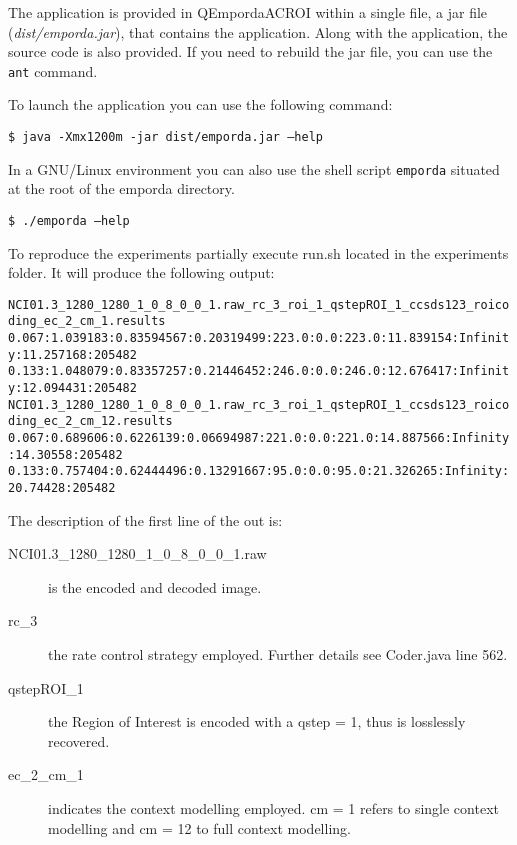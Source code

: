 \documentclass[a4paper,10pt]{article}
\newcommand{\me}{emporda\relax }
\begin{document}
The application is provided in QEmpordaACROI within a single file, a jar file (\emph{dist/\me{}.jar}), that contains the application.
Along with the application, the source code is also provided. If you need to rebuild the jar file, you can use the \texttt{ant} command.

To launch the application you can use the following command: 

\begin{framed}
\texttt{\$ java -Xmx1200m -jar dist/\me{}.jar --help}
\end{framed}

In a GNU/Linux environment you can also use the shell script \texttt{\me{}} situated at the root of the \me{} directory. 

\begin{framed}
\texttt{\$ ./\me{} --help}
\end{framed}

To reproduce the experiments partially execute run.sh located in the experiments folder. It will produce the following output:

\begin{framed}
\texttt{\small NCI01.3\_1280\_1280\_1\_0\_8\_0\_0\_1.raw\_rc\_3\_roi\_1\_qstepROI\_1\_ccsds123\_roicoding\_ec\_2\_cm\_1.results
\small 0.067:1.039183:0.83594567:0.20319499:223.0:0.0:223.0:11.839154:Infinity:11.257168:205482
\small 0.133:1.048079:0.83357257:0.21446452:246.0:0.0:246.0:12.676417:Infinity:12.094431:205482
\small NCI01.3\_1280\_1280\_1\_0\_8\_0\_0\_1.raw\_rc\_3\_roi\_1\_qstepROI\_1\_ccsds123\_roicoding\_ec\_2\_cm\_12.results
\small 0.067:0.689606:0.6226139:0.06694987:221.0:0.0:221.0:14.887566:Infinity:14.30558:205482
\small 0.133:0.757404:0.62444496:0.13291667:95.0:0.0:95.0:21.326265:Infinity:20.74428:205482
}
\end{framed}

The description of the first line of the out is:

\begin{description}
\item[NCI01.3\_1280\_1280\_1\_0\_8\_0\_0\_1.raw] is the encoded and decoded image.
\item[rc\_3] the rate control strategy employed. Further details see Coder.java line 562.
\item[qstepROI\_1] the Region of Interest is encoded with a qstep = 1, thus is losslessly recovered.
\item[ec\_2\_cm\_1] indicates the context modelling employed. cm = 1 refers to single context modelling and cm = 12 to full context modelling.
\end{description}
\end{document}
